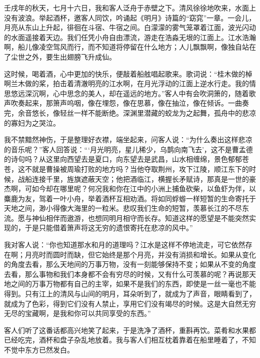 \documentclass[12pt,UTF-8,openany,a4]{ctexbook}
\begin{document}
\begin{large}
    \yiwen 
    壬戌年的秋天，七月十六日，我和客人泛舟于赤壁之下。清风徐徐地吹来，水面上没有波浪。举起酒杯，邀客人同饮，吟诵起《明月》诗篇的“窈窕”一章。一会儿，月亮从东山上升起，徘徊在斗宿、牛宿之间。白濛濛的雾气笼罩着江面，波光闪动的水面遥接着天边。我们任凭小舟自由漂流，游走在浩淼无垠的江面上。江水浩瀚啊，船儿像凌空驾风而行，而不知道将停留在什么地方；人儿飘飘啊，像独自站在了尘世之外，要生出翅膀飞升成仙。
    
    这时候，喝着酒，心中更加的快乐，便敲着船舷唱起歌来。歌词说：“桂木做的棹啊兰木做的桨，拍击着清澈明亮的江水啊，在月光浮动的江面上逆水行走。我的情思悠远深沉啊，心中思念的美人，却在遥远的地方。”客人中有会吹洞箫的，随着歌声吹奏起来，那箫声呜咽，像在埋怨，像在思慕，像在抽泣，像在倾诉。一曲奏完，余音悠长，像轻丝一样不能断绝。深渊里潜藏的蛟龙为之起舞，孤舟中的悲凉的寡妇为之哭泣。
    
    我不禁黯然神伤，于是整理好衣襟，端坐起来，问客人说：“为什么奏出这样悲凉的音乐呢？”客人回答说：“‘月光明亮，星儿稀少，乌鹊向南飞去’，这不是曹孟德的诗句吗？从这里向西望去是夏口，向东望去是武昌，山水相缠绵，景色郁郁苍苍，这不就是曹操被周瑜打败的地方吗？当他夺取荆州，攻下江陵，顺江东下的时候，战船连接千里，旌旗遮蔽天空；他把酒临江，横握长矛赋诗，那真是一世的豪杰啊，可如今却在哪里呢？何况我和你在江中的小洲上捕鱼砍柴，以鱼虾为伴，以麋鹿为友，驾着一叶小舟，举着酒杯互相劝酒。将如同蜉蝣一样短暂的生命寄托于天地之间，渺小得像大海里的一粒米。悲叹我们生命的短暂，羡慕长江的不尽东流。愿与神仙相伴而遨游，也想同明月相守而长存。知道这样的愿望是不能突然实现的，于是只能借着箫声将这无穷的遗恨寄托在悲凉的风中。”
    
    我对客人说：“你也知道那水和月的道理吗？江水是这样不停地流走，可它依然存在啊；月亮时而圆时而缺，但它始终是那个月亮，并没有消损和增长。如果从变化的角度去看，那么天地间的万事万物，没有一刻能够保持不变；如果从不变的角度去看，那么事物和我们本身都不会有穷尽的时候，又有什么可羡慕的呢？再说那天地之间的万事万物都有自己的主宰，如果不是我们的东西，即使是一丝一毫也不能得到。只有江上的清风与山间的明月，耳朵听到了，就成为了声音，眼睛看到了，就成为了色彩，得到它们没有人禁止，享用它们没有竭尽的时候。这是大自然无穷无尽的宝藏啊，是我和你可以共同享受的东西。”
    
    客人们听了这番话都高兴地笑了起来，于是洗净了酒杯，重斟再饮。菜肴和水果都已经吃完，酒杯和盘子杂乱地放着。我与客人们相互枕着靠着在船里睡着了，不知不觉中东方已然发白。
    
\end{large}
\end{document}
